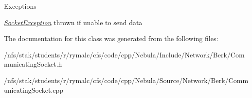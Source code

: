 \begin{DoxyExceptions}{Exceptions}
\item[{\em \hyperlink{classSocketException}{SocketException}}]thrown if unable to send data \end{DoxyExceptions}


The documentation for this class was generated from the following files:\begin{DoxyCompactItemize}
\item 
/nfs/stak/students/r/rymalc/cfs/code/cpp/Nebula/Include/Network/Berk/CommunicatingSocket.h\item 
/nfs/stak/students/r/rymalc/cfs/code/cpp/Nebula/Source/Network/Berk/CommunicatingSocket.cpp\end{DoxyCompactItemize}
